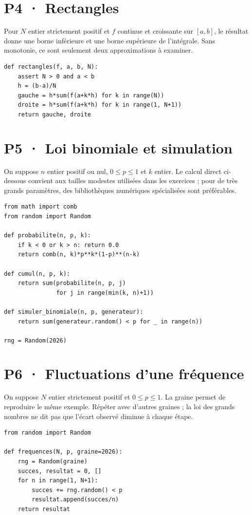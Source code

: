 \section{P4 · Rectangles}
Pour $N$ entier strictement positif et $f$ continue et croissante sur $[a,b]$, le résultat donne une borne inférieure et une borne supérieure de l'intégrale. Sans monotonie, ce sont seulement deux approximations à examiner.
\begin{lstlisting}
def rectangles(f, a, b, N):
    assert N > 0 and a < b
    h = (b-a)/N
    gauche = h*sum(f(a+k*h) for k in range(N))
    droite = h*sum(f(a+k*h) for k in range(1, N+1))
    return gauche, droite
\end{lstlisting}
\clearpage\section{P5 · Loi binomiale et simulation}
On suppose $n$ entier positif ou nul, $0\le p\le1$ et $k$ entier. Le calcul direct ci-dessous convient aux tailles modestes utilisées dans les exercices ; pour de très grands paramètres, des bibliothèques numériques spécialisées sont préférables.
\begin{lstlisting}
from math import comb
from random import Random

def probabilite(n, p, k):
    if k < 0 or k > n: return 0.0
    return comb(n, k)*p**k*(1-p)**(n-k)

def cumul(n, p, k):
    return sum(probabilite(n, p, j)
               for j in range(min(k, n)+1))

def simuler_binomiale(n, p, generateur):
    return sum(generateur.random() < p for _ in range(n))

rng = Random(2026)
\end{lstlisting}
\section{P6 · Fluctuations d'une fréquence}
On suppose $N$ entier strictement positif et $0\le p\le1$. La graine permet de reproduire le même exemple. Répéter avec d'autres graines ; la loi des grands nombres ne dit pas que l'écart observé diminue à chaque étape.
\begin{lstlisting}
from random import Random

def frequences(N, p, graine=2026):
    rng = Random(graine)
    succes, resultat = 0, []
    for n in range(1, N+1):
        succes += rng.random() < p
        resultat.append(succes/n)
    return resultat
\end{lstlisting}
